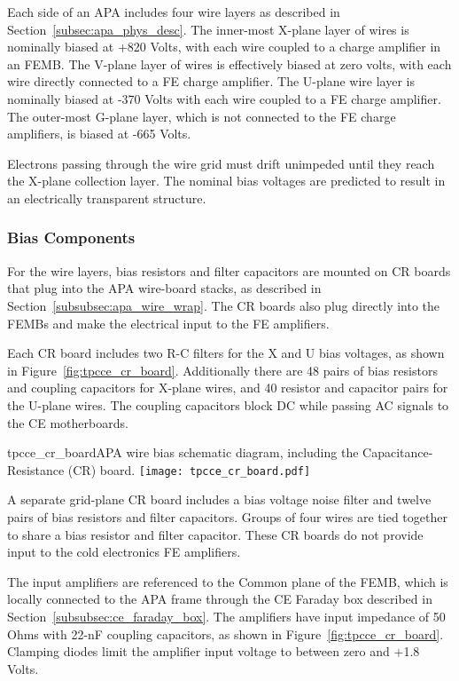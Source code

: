 Each side of an APA includes four wire layers as described in Section~\ref{subsec:apa_phys_desc}. 
The inner-most X-plane layer of wires is nominally biased at +820 Volts, with each wire coupled 
to a charge amplifier in an FEMB. The V-plane layer of wires is effectively biased at zero volts, 
with each wire directly connected to a FE charge amplifier. The U-plane wire layer is nominally 
biased at -370 Volts with each wire coupled to a FE charge amplifier. The outer-most G-plane layer,
which is not connected to the FE charge amplifiers, is biased at -665 Volts.

Electrons passing through the wire grid must drift unimpeded until they reach the X-plane 
collection layer. The nominal bias voltages are predicted to result in an electrically 
transparent structure.

\subsubsection{Bias Components}
\label{subsec:ce_bias_comp}

For the wire layers, bias resistors and filter capacitors are mounted on CR boards that plug 
into the APA wire-board stacks, as described in Section~\ref{subsubsec:apa_wire_wrap}. The CR boards 
also plug directly into the FEMBs and make the electrical input to the FE amplifiers.

Each CR board includes two R-C filters for the X and U bias voltages, as shown 
in Figure~\ref{fig:tpcce_cr_board}. Additionally there are 48 
pairs of bias resistors and coupling capacitors for X-plane wires, and 40 resistor and 
capacitor pairs for the U-plane wires. The coupling capacitors block DC while passing AC 
signals to the CE motherboards.

\begin{cdrfigure}{tpcce_cr_board}{APA wire bias 
schematic diagram, including the Capacitance-Resistance (CR) board.}
\texttt{[image: tpcce\_cr\_board.pdf]}
\end{cdrfigure}

A separate grid-plane CR board includes a bias voltage noise filter and twelve pairs of 
bias resistors and filter capacitors. Groups of four wires are tied together to share a 
bias resistor and filter capacitor. These CR boards do not provide input to the cold
electronics FE amplifiers.

The input amplifiers are referenced to the Common plane of the FEMB, which is locally connected 
to the APA frame through the CE Faraday box described in Section~\ref{subsubsec:ce_faraday_box}. The amplifiers 
have input impedance of 50 Ohms with 22-nF coupling capacitors, as shown in Figure~\ref{fig:tpcce_cr_board}. 
Clamping diodes limit the amplifier input voltage to between zero and +1.8 Volts.

